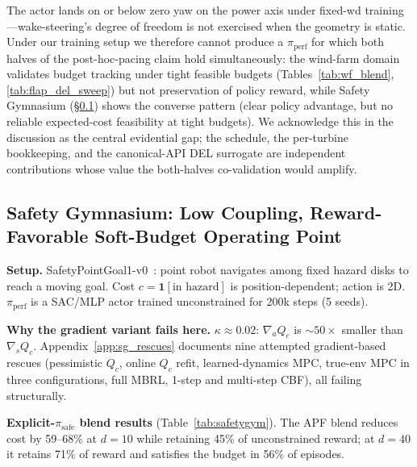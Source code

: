 The actor lands on or below zero yaw on the power axis under fixed-wd training---wake-steering's degree of freedom is not exercised when the geometry is static.
Under our training setup we therefore cannot produce a $\pi_{\mathrm{perf}}$ for which both halves of the post-hoc-pacing claim hold simultaneously: the wind-farm domain validates budget tracking under tight feasible budgets (Tables~\ref{tab:wf_blend}, \ref{tab:flap_del_sweep}) but not preservation of policy reward, while Safety Gymnasium (\S\ref{sec:sg_results}) shows the converse pattern (clear policy advantage, but no reliable expected-cost feasibility at tight budgets).
We acknowledge this in the discussion as the central evidential gap; the schedule, the per-turbine bookkeeping, and the canonical-API DEL surrogate are independent contributions whose value the both-halves co-validation would amplify.

\subsection{Safety Gymnasium: Low Coupling, Reward-Favorable Soft-Budget Operating Point}
\label{sec:sg_results}

\textbf{Setup.}
SafetyPointGoal1-v0~\citep{ji2023safetygym}: point robot navigates among fixed hazard disks to reach a moving goal.
Cost $c\!=\!\mathbf{1}[\text{in hazard}]$ is position-dependent; action is 2D.
$\pi_{\mathrm{perf}}$ is a SAC/MLP actor trained unconstrained for 200k steps (5 seeds).

\textbf{Why the gradient variant fails here.}
$\kappa\!\approx\!0.02$: $\nabla_a Q_c$ is $\sim\!50\times$ smaller than $\nabla_s Q_c$.
Appendix~\ref{app:sg_rescues} documents nine attempted gradient-based rescues (pessimistic $Q_c$, online $Q_c$ refit, learned-dynamics MPC, true-env MPC in three configurations, full MBRL, 1-step and multi-step CBF), all failing structurally.

\textbf{Explicit-$\pi_{\mathrm{safe}}$ blend results} (Table~\ref{tab:safetygym}).
The APF blend reduces cost by 59--68\% at $d\!=\!10$ while retaining 45\% of unconstrained reward; at $d\!=\!40$ it retains 71\% of reward and satisfies the budget in 56\% of episodes.

